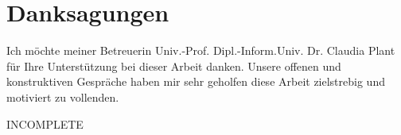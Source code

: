 

\chapter*{Danksagungen} %
\label{cha:acknowledgements}
\noindent

Ich möchte meiner Betreuerin Univ.-Prof. Dipl.-Inform.Univ. Dr. Claudia Plant für Ihre Unterstützung bei dieser Arbeit danken. Unsere offenen und konstruktiven Gespräche haben mir sehr geholfen diese Arbeit zielstrebig und motiviert zu vollenden.

INCOMPLETE
